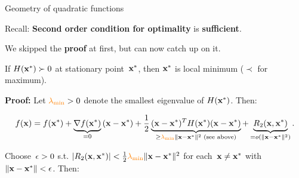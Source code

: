 \documentclass[11pt,compress,t,notes=noshow, xcolor=table]{beamer}
\begin{document}
\begin{vbframe}{Geometry of quadratic functions}
\begin{itemize}



\end{itemize}

Recall: \textbf{Second order condition for optimality} is \textbf{sufficient}.

\medskip

We skipped the \textbf{proof} at first, but can now catch up on it.


    \footnotesize
     If $H(\mathbf{x}^\ast) \succ 0$ at stationary point~$\mathbf{x}^\ast$, then $\mathbf{x}^\ast$ is local minimum ($\prec$ for maximum).

     \medskip

    \textbf{Proof:}
    Let $\textcolor{orange}{\lambda_\text{min}}>0$ denote the smallest eigenvalue of $H(\mathbf{x}^\ast)$.
    Then:
    
    
    \begin{equation*}
        f(\mathbf{x}) = f(\mathbf{x}^\ast) + \underbrace{\nabla f(\mathbf{x}^\ast)}_{=0}{}(\mathbf{x}-\mathbf{x}^\ast) + \frac{1}{2}\underbrace{(\mathbf{x}-\mathbf{x}^\ast)^T H(\mathbf{x}^\ast)(\mathbf{x}-\mathbf{x}^\ast)}_{\geq \textcolor{orange}{\lambda_\text{min}} \|\mathbf{x}-\mathbf{x}^\ast\|^2 \text{ (see above)}} + \underbrace{R_2(\mathbf{x},\mathbf{x}^\ast)}_{=o(\|\mathbf{x}-\mathbf{x}^\ast\|^2)}.
    \end{equation*}

    Choose~$\epsilon>0$ s.t. $|R_2(\mathbf{x},\mathbf{x}^\ast)| < \frac{1}{2} \textcolor{orange}{\lambda_\text{min}} \|\mathbf{x}-\mathbf{x}^\ast\|^2$ for each~$\mathbf{x} \neq \mathbf{x}^\ast$ with $\|\mathbf{x}-\mathbf{x}^\ast\|<\epsilon$.
    Then:


\end{vbframe}
\end{document}
